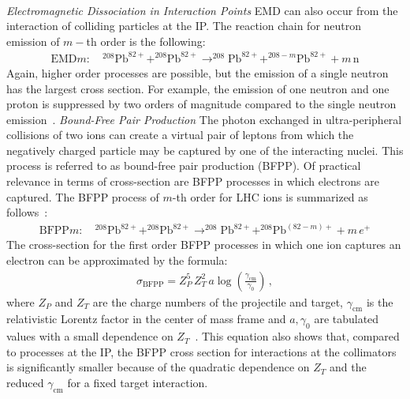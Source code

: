 \mbox{} \\
\textit{Electromagnetic Dissociation in Interaction Points} \newline
EMD can also occur from the interaction of colliding particles at the IP. The reaction chain for neutron emission of $m-$th order is the following:
%
%
\begin{align}
   \text{EMD}m:  \quad ^{208}\text{Pb}^{82+} + ^{208}\text{Pb}^{82+} \rightarrow ^{208}\text{Pb}^{82+} + ^{208-m}\text{Pb}^{82+} + m \, \text{n}
\end{align}
%
Again, higher order processes are possible, but the emission of a single neutron has the largest cross section. For example, the emission of one neutron and one proton is suppressed by two orders of magnitude compared to the single neutron emission~\cite{Pshenichnov:prinvate}.
%
\newline \mbox{} \newline
\textit{Bound-Free Pair Production} \newline
The photon exchanged in ultra-peripheral collisions of two ions can create a virtual pair of leptons from which the negatively charged particle may be captured by one of the interacting nuclei. This process is referred to as bound-free pair production (BFPP). Of practical relevance in terms of cross-section are BFPP processes in which electrons are captured. The BFPP process of $m$-th order for LHC \lead ions is summarized as follows~\cite{BFPP1}:
%
\begin{align}
  \text{BFPP}m:  \quad ^{208}\text{Pb}^{82+} + ^{208}\text{Pb}^{82+} \rightarrow ^{208}\text{Pb}^{82+} + ^{208}\text{Pb}^{(82-m)+} + m \, e^+
\end{align}
The cross-section for the first order BFPP processes in which one ion captures an electron can be approximated by the formula:
%
\begin{align}
  \sigma_\text{BFPP} = Z_P^5 \, Z_T^2 \, a \log \left( \frac{\gamma_\text{cm}}{\gamma_0} \right) \, ,
\end{align}
%
where $Z_P$ and $Z_T$ are the charge numbers of the projectile and target, $\gamma_\text{cm}$ is the relativistic Lorentz factor in the center of mass frame and $a,\gamma_0$ are tabulated values with a small dependence on $Z_T$~\cite{PhysRev:63:Meier}. This equation also shows that, compared to processes at the IP, the BFPP cross section for interactions at the collimators is significantly smaller because of the quadratic dependence on $Z_T$ and the reduced $\gamma_\text{cm}$ for a fixed target interaction.
\vspace{0.2cm}

